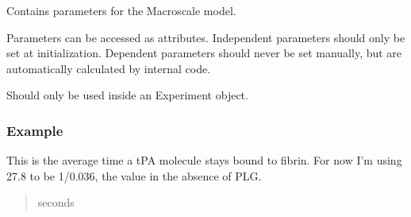 \documentclass[letterpaper,10pt,english]{sphinxmanual}
\begin{document}
\begin{fulllineitems}
\sphinxAtStartPar
Contains parameters for the Macroscale model.

\sphinxAtStartPar
Parameters can be accessed as attributes.
Independent parameters should only be set at initialization.
Dependent parameters should never be set manually, but are automatically
calculated by internal code.

\sphinxAtStartPar
Should only be used inside an Experiment object.
\subsubsection*{Example}

\begin{sphinxVerbatim}[commandchars=\\\{\}]
  
     
  
\end{sphinxVerbatim}

\begin{fulllineitems}
\label{\detokenize{lysis.util:lysis.util.parameters.MacroParameters.average_bound_time}}
\pysigstartsignatures
{}
\pysigstopsignatures
\sphinxAtStartPar
This is the average time a tPA molecule stays bound to fibrin.
For now I’m using 27.8 to be 1/0.036, the value in the absence of PLG.
\begin{quote}\begin{description}
\sphinxAtStartPar
seconds


\end{description}
\end{quote}
\end{fulllineitems}
\end{fulllineitems}
\end{document}
